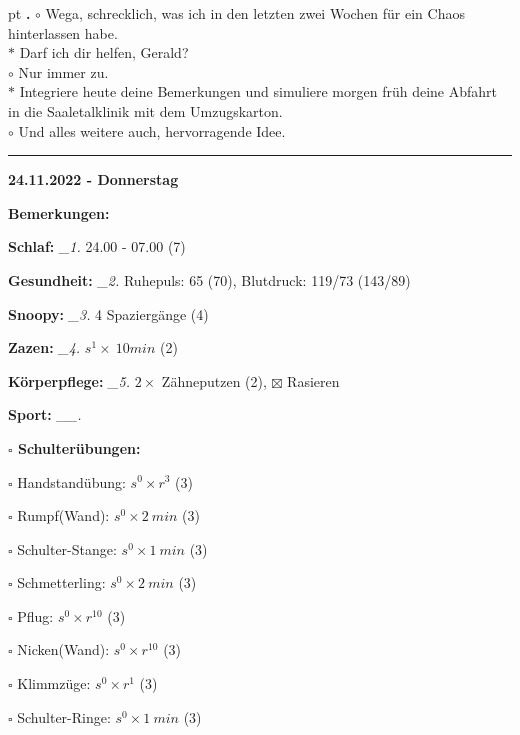 \documentclass[10pt,a4paper]{article}
\newcounter{notec}
\newcommand\notep[1]{%
  \stepcounter{notec}
  \vskip #1pt
  {\bf\arabic{notec}.}
}
\newcommand\prop[1] {{\color {alizarin} {\bf #1}}}             %
\newcommand\rele[1] {{\color {english} \bf {#1}}}              %
\newcommand\mand[1] {{\color {burntorange} {\bf #1}}}          %
\newcommand\ddivide {\vskip -9pt \hrule \vskip 6pt}
\newcommand\topspace{\vskip -15pt \hskip 20pt}
\newcommand\n[1] { {\sl #1.} \hskip 5pt }
\begin{document}
\begin{mdframed}[style=daystyle]
  \notep 4 $\circ$ Wega, schrecklich, was ich in den letzten zwei Wochen für ein
  Chaos hinterlassen habe. \\
  $\ast$ Darf ich dir helfen, Gerald? \\
  $\circ$ Nur immer zu. \\
  $\ast$ Integriere heute deine Bemerkungen und simuliere morgen früh deine
  Abfahrt in die Saaletalklinik mit dem Umzugskarton. \\
  $\circ$ Und alles weitere auch, hervorragende Idee.

\end{mdframed}


\ddivide
{\rele {24.11.2022 - Donnerstag}}

\begin{mdframed}[style=daystyle]
  \begin{labeling}{{\mand {Bemerkungen:}}}
    \setlength\itemsep{-3pt}
  \item[{\mand {Schlaf:}}]        \n{\_1} 24.00 - 07.00 (7)
  \item[{\mand {Gesundheit:}}]    \n{\_2} Ruhepuls: 65 (70), Blutdruck: 119/73 (143/89)
  \item[{\mand {Snoopy:}}]        \n{\_3} 4 Spaziergänge (4) 
  \item[{\mand {Zazen:}}]         \n{\_4} $s^1 \times\ 10 min$ (2)
  \item[{\mand {Körperpflege:}}]  \n{\_5} $2 \times$ Zähneputzen (2), $\boxtimes$ Rasieren
  \item[{\mand {Sport:}}]        \n{\_\_}
    \topspace
    \begin{minipage}{0.75\textwidth}  
      \begin{labeling}{\prop {$\square$ {Schulterübungen:}}} 
        \setlength\itemsep{-3pt}
      \item[$\square$ Handstandübung:]  $s^0 \times r^{3}$ (3)
      \item[$\square$ Rumpf(Wand):]     $s^0 \times 2\ min$ (3)
      \item[$\square$ Schulter-Stange:] $s^0 \times 1\ min$ (3)
      \item[$\square$ Schmetterling:]   $s^0 \times 2\ min$ (3)
      \item[$\square$ Pflug:]           $s^0 \times r^{10}$ (3)
      \item[$\square$ Nicken(Wand):]    $s^0 \times r^{10}$ (3)
      \item[$\square$ Klimmzüge:]       $s^0 \times r^1$ (3)
      \item[$\square$ Schulter-Ringe:]  $s^0 \times 1\ min$ (3)

\end{labeling}
\end{minipage}
\end{labeling}
\end{mdframed}
\end{document}
